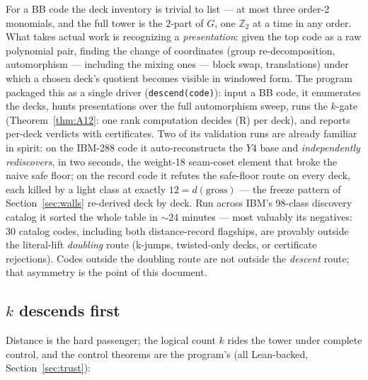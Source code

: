 \documentclass[11pt]{article}
\theoremstyle{plain}
\theoremstyle{definition}
\theoremstyle{remark}
\newcommand{\Z}{\mathbb{Z}}
\begin{document}
For a BB code the deck inventory is trivial to list --- at most three
order-2 monomials, and the full tower is the $2$-part of $G$, one
$\Z_2$ at a time in any order. What takes actual work is recognizing a
\emph{presentation}: given the top code as a raw polynomial pair, finding
the change of coordinates (group re-decomposition, automorphism ---
including the mixing ones --- block swap, translations) under which a
chosen deck's quotient becomes visible in windowed form. The program
packaged this as a single driver (\texttt{descend(code)}): input a BB
code, it enumerates the decks, hunts presentations over the full
automorphism sweep, runs the $k$-gate (Theorem~\ref{thm:A12}: one rank
computation decides (R) per deck), and reports per-deck verdicts with
certificates. Two of its validation runs are already familiar in
spirit: on the IBM-288 code it auto-reconstructs the $Y4$ base and
\emph{independently rediscovers}, in two seconds, the weight-18
seam-coset element that broke the naive safe floor; on the record code
it refutes the safe-floor route on every deck, each killed by a light
class at exactly $12 = d(\mathrm{gross})$ --- the freeze pattern of
Section~\ref{sec:walls} re-derived deck by deck. Run across IBM's
98-class discovery catalog it sorted the whole table in
${\sim}24$ minutes --- most valuably its negatives: $30$ catalog codes,
including both distance-record flagships, are provably outside the
literal-lift \emph{doubling} route (k-jumps, twisted-only decks, or
certificate rejections). Codes outside the doubling route are not
outside the \emph{descent} route; that asymmetry is the point of this
document.

\subsection{\texorpdfstring{$k$}{k} descends first}

Distance is the hard passenger; the logical count $k$ rides the tower
under complete control, and the control theorems are the program's
(all Lean-backed, Section~\ref{sec:trust}):
\end{document}
